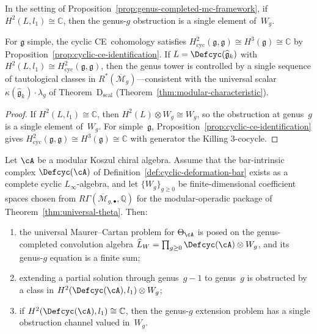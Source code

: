 \begin{corollary}\label{cor:one-dim-obstruction}
In the setting of
Proposition~\textup{\ref{prop:genus-completed-mc-framework}},
if $H^2(L, l_1) \cong \mathbb{C}$, then the genus-$g$
obstruction is a single element of~$W_g$.

For $\mathfrak{g}$ simple, the cyclic
CE~cohomology satisfies
$H^2_{\mathrm{cyc}}(\mathfrak{g}, \mathfrak{g})
\cong H^3(\mathfrak{g}) \cong \mathbb{C}$
by Proposition~\textup{\ref{prop:cyclic-ce-identification}}.
If $L = \Defcyc(\widehat{\mathfrak{g}}_k)$ with
$H^2(L, l_1) \cong H^2_{\mathrm{cyc}}(\mathfrak{g},
\mathfrak{g})$, then the genus tower is controlled by a
single sequence of tautological classes in
$R^*(\overline{\mathcal{M}}_g)$---consistent with the
universal scalar
$\kappa(\widehat{\mathfrak{g}}_k) \cdot \lambda_g$
of Theorem~D$_{\mathrm{scal}}$
(\textup{Theorem~\ref{thm:modular-characteristic}}).
\end{corollary}

\begin{proof}
If $H^2(L, l_1) \cong \mathbb{C}$, then
$H^2(L) \otimes W_g \cong W_g$, so the obstruction at
genus~$g$ is a single element of~$W_g$.
For simple~$\mathfrak{g}$,
Proposition~\ref{prop:cyclic-ce-identification} gives
$H^2_{\mathrm{cyc}}(\mathfrak{g}, \mathfrak{g}) \cong
H^3(\mathfrak{g}) \cong \mathbb{C}$ with generator the
Killing $3$-cocycle.
\end{proof}

\begin{proposition}\label{prop:mc2-reduction-principle}
Let $\cA$ be a modular Koszul chiral algebra.  Assume that the
bar-intrinsic complex $\Defcyc(\cA)$ of
Definition~\ref{def:cyclic-deformation-bar} exists as a complete cyclic
$L_\infty$-algebra, and let $\{W_g\}_{g \geq 0}$ be finite-dimensional
coefficient spaces chosen from
$R\Gamma(\overline{\mathcal{M}}_{g,\bullet}, \mathbb{Q})$ for the
modular-operadic package of
Theorem~\ref{thm:universal-theta}.  Then:
\begin{enumerate}[label=\textup{(\roman*)}]
\item the universal Maurer--Cartan problem for $\Theta_{\cA}$ is posed
  on the genus-completed convolution algebra
  $\widehat{L}_W = \prod_{g \geq 0}\Defcyc(\cA)\otimes W_g$, and its
  genus-$g$ equation is a finite sum;
\item extending a partial solution through genus~$g-1$ to genus~$g$ is
  obstructed by a class in
  $H^2(\Defcyc(\cA), l_1) \otimes W_g$;
\item if $H^2(\Defcyc(\cA), l_1) \cong \mathbb{C}$, then the
  genus-$g$ extension problem has a single obstruction channel valued
  in~$W_g$.
\end{enumerate}
\end{proposition}

